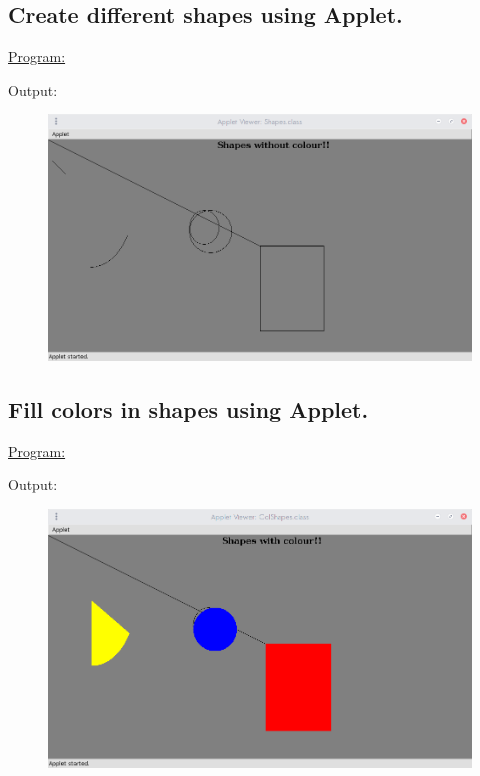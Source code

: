 \documentclass[a4paper,11pt]{article}
\begin{document}
\bigskip

\subsection{Create different shapes using Applet.}
\underline{Program:}


Output:
\begin{figure}[H]
\centering
\includegraphics[width=350pt,height=\textheight,keepaspectratio]{../assign2/pics/3.png}
\end{figure}

\bigskip

\subsection{Fill colors in shapes using Applet.}
\underline{Program:}


Output:
\begin{figure}[H]
\centering
\includegraphics[width=350pt,height=\textheight,keepaspectratio]{../assign2/pics/4.png}
\end{figure}
\end{document}

